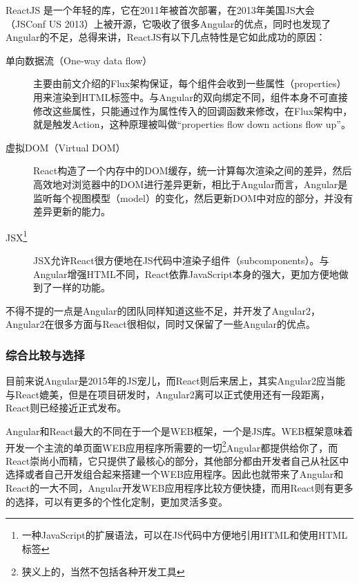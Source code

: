 ReactJS 是一个年轻的库，它在2011年被首次部署，在2013年美国JS大会（JSConf US 2013）上被开源，它吸收了很多Angular的优点，同时也发现了Angular的不足，总得来讲，ReactJS有以下几点特性是它如此成功的原因：

\begin{description}
  \item[单向数据流（One-way data flow）] 主要由前文介绍的Flux架构保证，每个组件会收到一些属性（properties）用来渲染到HTML标签中。与Angular的双向绑定不同，组件本身不可直接修改这些属性，只能通过作为属性传入的回调函数来修改，在Flux架构中，就是触发Action，这种原理被叫做“properties flow down actions flow up”。
  \item[虚拟DOM（Virtual DOM）] React构造了一个内存中的DOM缓存，统一计算每次渲染之间的差异，然后高效地对浏览器中的DOM进行差异更新，相比于Angular而言，Angular是监听每个视图模型（model）的变化，然后更新DOM中对应的部分，并没有差异更新的能力。
  \item[JSX\footnote{一种JavaScript的扩展语法，可以在JS代码中方便地引用HTML和使用HTML标签}] JSX允许React很方便地在JS代码中渲染子组件（subcomponents）。与Angular增强HTML不同，React依靠JavaScript本身的强大，更加方便地做到了一样的功能。
\end{description}

不得不提的一点是Angular的团队同样知道这些不足，并开发了Angular2，Angular2在很多方面与React很相似，同时又保留了一些Angular的优点。

\subsubsection{综合比较与选择}
目前来说Angular是2015年的JS宠儿，而React则后来居上，其实Angular2应当能与React媲美，但是在项目研发时，Angular2离可以正式使用还有一段距离，React则已经接近正式发布。

Angular和React最大的不同在于一个是WEB框架，一个是JS库。WEB框架意味着开发一个主流的单页面WEB应用程序所需要的一切\footnote{狭义上的，当然不包括各种开发工具}Angular都提供给你了，而React崇尚小而精，它只提供了最核心的部分，其他部分都由开发者自己从社区中选择或者自己开发组合起来搭建一个WEB应用程序。因此也就带来了Angular和React的一大不同，Angular开发WEB应用程序比较方便快捷，而用React则有更多的选择，可以有更多的个性化定制，更加灵活多变。

